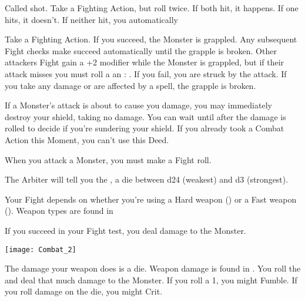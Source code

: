 {  Called shot.  Take a Fighting Action, but roll twice.  If both hit, it happens.  If one hits, it doesn't.  If neither hit, you automatically 



  Take a Fighting Action.  If you succeed, the Monster is grappled.  Any subsequent Fight checks  make succeed automatically until the grapple is broken.  Other attackers Fight \RO gain a +2 modifier while the Monster is grappled, but if their attack misses you must roll a an \RS : \DEX.  If you fail, you are struck by the attack.  If you take any damage or are affected by a spell, the grapple is broken.


  If a Monster's attack is about to cause you  damage, you may immediately destroy your shield, taking no damage. You can wait until after the damage is rolled to decide if you're sundering your shield.  If you already took a Combat Action this Moment, you can't use this Deed.






  When you attack a Monster, you must make a Fight roll.


  The Arbiter will tell you the , a \STATIC die between d24 (weakest) and d3 (strongest).

  Your Fight \RO depends on whether you're using a Hard weapon (\VIG) or a Fast weapon (\DEX).  Weapon types are found in 

  If you succeed in your Fight \RO test, you deal damage to the Monster.

    \begin{center}
  \texttt{[image: Combat\_2]}
  \end{center}


  The damage your weapon does is a \STATIC die.  Weapon damage is found in .  You roll the \STATIC and deal that much damage to the Monster.  If you roll a 1, you might Fumble.  If you roll \MAX damage on the die, you might Crit.

}
